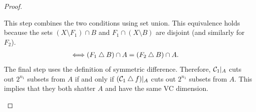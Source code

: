 \begin{proof}
\begin{outline}
        This step combines the two conditions using set union. This equivalence holds because the sets $(X\setminus F_1)\cap B$ and $F_1\cap (X\setminus B)$ are disjoint (and similarly for $F_2$).
        \begin{align*}
            \iff & 
            (F_1\bigtriangleup B)\cap A = (F_2\bigtriangleup B)\cap A.
        \end{align*}
        The final step uses the definition of symmetric difference. 
        \2 Therefore, $\mathcal{C}_1|_A$ cuts out $2^{n_1}$ subsets from $A$ if and only if $(\mathcal{C}_1\bigtriangleup f)|_A$ cuts out $2^{n_1}$ subsets from $A$. This implies that they both shatter $A$ and have the same VC dimension.

\end{outline}
\end{proof}
